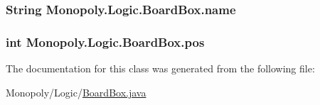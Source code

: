 \subsubsection[{\texorpdfstring{name}{name}}]{\setlength{\rightskip}{0pt plus 5cm}String Monopoly.\+Logic.\+Board\+Box.\+name\hspace{0.3cm}{\ttfamily [protected]}}\hypertarget{class_monopoly_1_1_logic_1_1_board_box_ad5cd8d9fc191dc2df82b9fe7766210fd}{}\label{class_monopoly_1_1_logic_1_1_board_box_ad5cd8d9fc191dc2df82b9fe7766210fd}
\subsubsection[{\texorpdfstring{pos}{pos}}]{\setlength{\rightskip}{0pt plus 5cm}int Monopoly.\+Logic.\+Board\+Box.\+pos\hspace{0.3cm}{\ttfamily [protected]}}\hypertarget{class_monopoly_1_1_logic_1_1_board_box_a750c8300a134809e0eb5772b3ba92258}{}\label{class_monopoly_1_1_logic_1_1_board_box_a750c8300a134809e0eb5772b3ba92258}


The documentation for this class was generated from the following file\+:\begin{DoxyCompactItemize}
\item 
Monopoly/\+Logic/\hyperlink{_board_box_8java}{Board\+Box.\+java}\end{DoxyCompactItemize}
